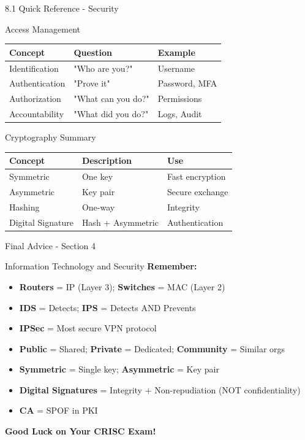 \documentclass{beamer}
\begin{document}
	\begin{frame}{8.1 Quick Reference - Security}
		\begin{block}{Access Management}
			\begin{tabular}{|p{2.5cm}|p{4cm}|p{4.5cm}|}
				\hline
				\textbf{Concept} & \textbf{Question} & \textbf{Example} \\
				\hline
				Identification & "Who are you?" & Username \\
				\hline
				Authentication & "Prove it" & Password, MFA \\
				\hline
				Authorization & "What can you do?" & Permissions \\
				\hline
				Accountability & "What did you do?" & Logs, Audit \\
				\hline
			\end{tabular}
		\end{block}
		
		\begin{block}{Cryptography Summary}
			\begin{tabular}{|p{2.5cm}|p{4cm}|p{4.5cm}|}
				\hline
				\textbf{Concept} & \textbf{Description} & \textbf{Use} \\
				\hline
				Symmetric & One key & Fast encryption \\
				\hline
				Asymmetric & Key pair & Secure exchange \\
				\hline
				Hashing & One-way & Integrity \\
				\hline
				Digital Signature & Hash + Asymmetric & Authentication \\
				\hline
			\end{tabular}
		\end{block}
	\end{frame}
	
	\begin{frame}{Final Advice - Section 4}
		\begin{block}{Information Technology and Security}
			\centering
			\vspace{0.3cm}
			\textbf{Remember:}
			\begin{itemize}
				\item \textbf{Routers} = IP (Layer 3); \textbf{Switches} = MAC (Layer 2)
				\item \textbf{IDS} = Detects; \textbf{IPS} = Detects AND Prevents
				\item \textbf{IPSec} = Most secure VPN protocol
				\item \textbf{Public} = Shared; \textbf{Private} = Dedicated; \textbf{Community} = Similar orgs
				\item \textbf{Symmetric} = Single key; \textbf{Asymmetric} = Key pair
				\item \textbf{Digital Signatures} = Integrity + Non-repudiation (NOT confidentiality)
				\item \textbf{CA} = SPOF in PKI
			\end{itemize}
			\vspace{0.5cm}
			\textbf{Good Luck on Your CRISC Exam!}
		\end{block}
	\end{frame}
	
	
\end{document}
